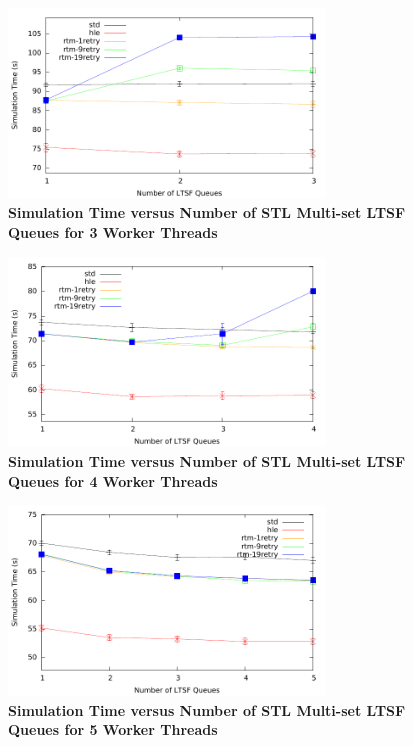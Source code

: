 \documentclass[11pt]{book}
\begin{document}
\begin{figure}[H]
    \centering
    \graphicspath{ {./figures/} }
    \includegraphics[width=0.75\textwidth,keepaspectratio]{hugeepidemicsim-CONTmig-timeVSschedQs-multiset-3thread}
    \caption{\textbf{Simulation Time versus Number of STL Multi-set LTSF Queues
    for 3 Worker Threads}}
    \label{fig:contThrMig_timeVSschq_3threads}
\end{figure}

\begin{figure}[H]
    \centering
    \graphicspath{ {./figures/} }
    \includegraphics[width=0.75\textwidth,keepaspectratio]{hugeepidemicsim-CONTmig-timeVSschedQs-multiset-4thread}
    \caption{\textbf{Simulation Time versus Number of STL Multi-set LTSF Queues
    for 4 Worker Threads}}
    \label{fig:contThrMig_timeVSschq_4threads}
\end{figure}

\begin{figure}[H]
    \centering
    \graphicspath{ {./figures/} }
    \includegraphics[width=0.75\textwidth,keepaspectratio]{hugeepidemicsim-CONTmig-timeVSschedQs-multiset-5thread}
    \caption{\textbf{Simulation Time versus Number of STL Multi-set LTSF Queues
    for 5 Worker Threads}}
    \label{fig:contThrMig_timeVSschq_5threads}
\end{figure}
\end{document}

